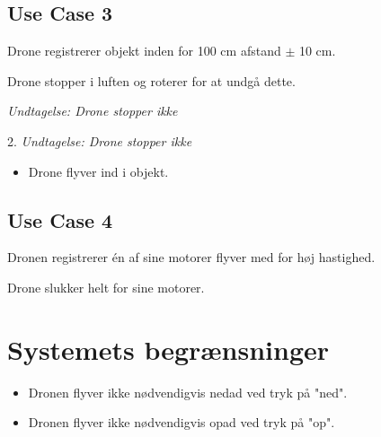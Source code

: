 \documentclass[Main]{subfiles}
\begin{document}
\subsection{Use Case 3}
\begin{UseCase}

	\begin{normFor}
	\item Drone registrerer objekt inden for 100 cm afstand $\pm$ 10 cm.
	\item Drone stopper i luften og roterer for at undgå dette.
	\item[] \textit{Undtagelse: Drone stopper ikke}
	\end{normFor} 

	\begin{normFor}
	\item[2.] \textit{Undtagelse: Drone stopper ikke}
		\begin{itemize}
		\item Drone flyver ind i objekt.
		\end{itemize}
	\end{normFor} 
	
\end{UseCase}


\subsection{Use Case 4}
\begin{UseCase}

	\begin{normFor}
	\item Dronen registrerer én af sine motorer flyver med for høj hastighed.
	\item Drone slukker helt for sine motorer.
	\end{normFor} 
\end{UseCase}

	
\section{Systemets begrænsninger}
\begin{itemize}
\item Dronen flyver ikke nødvendigvis nedad ved tryk på "ned".
\item Dronen flyver ikke nødvendigvis opad ved tryk på "op".
\end{itemize}
\end{document}
